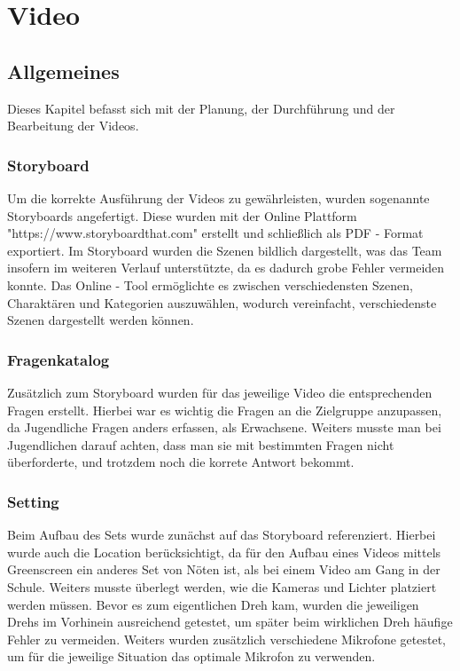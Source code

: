 \chapter{Video}
\section{Allgemeines}
\renewcommand{\kapitelautor}{Autor: Kerstin Schön}
Dieses Kapitel befasst sich mit der Planung, der Durchführung und der Bearbeitung der Videos. 

\subsection{Storyboard}
\renewcommand{\kapitelautor}{Autor: Kerstin Schön}
Um die korrekte Ausführung der Videos zu gewährleisten, wurden sogenannte Storyboards angefertigt. Diese wurden mit der Online Plattform "https://www.storyboardthat.com" erstellt und schließlich als PDF - Format exportiert.
Im Storyboard wurden die Szenen bildlich dargestellt, was das Team insofern im weiteren Verlauf unterstützte, da es dadurch grobe Fehler vermeiden konnte.
Das Online - Tool ermöglichte es zwischen verschiedensten Szenen, Charaktären und Kategorien auszuwählen, wodurch vereinfacht, verschiedenste Szenen dargestellt werden können.
 
\subsection{Fragenkatalog}
\renewcommand{\kapitelautor}{Autor: Kerstin Schön}
Zusätzlich zum Storyboard wurden für das jeweilige Video die entsprechenden Fragen erstellt. Hierbei war es wichtig die Fragen an die Zielgruppe anzupassen, da Jugendliche Fragen anders erfassen, als Erwachsene. Weiters musste man bei Jugendlichen darauf achten, dass man sie mit bestimmten Fragen nicht überforderte, und trotzdem noch die korrete Antwort bekommt.

\subsection{Setting}
\renewcommand{\kapitelautor}{Autor: Kerstin Schön}
Beim Aufbau des Sets wurde zunächst auf das Storyboard referenziert. Hierbei wurde auch die Location berücksichtigt, da für  den Aufbau eines Videos mittels Greenscreen ein anderes Set von Nöten ist, als bei einem Video am Gang in der Schule. Weiters musste überlegt werden, wie die Kameras und Lichter platziert werden müssen. Bevor es zum eigentlichen Dreh kam, wurden die jeweiligen Drehs im Vorhinein ausreichend getestet, um später beim wirklichen Dreh häufige Fehler zu vermeiden. Weiters wurden zusätzlich verschiedene Mikrofone getestet, um für die jeweilige Situation das optimale Mikrofon zu verwenden.

